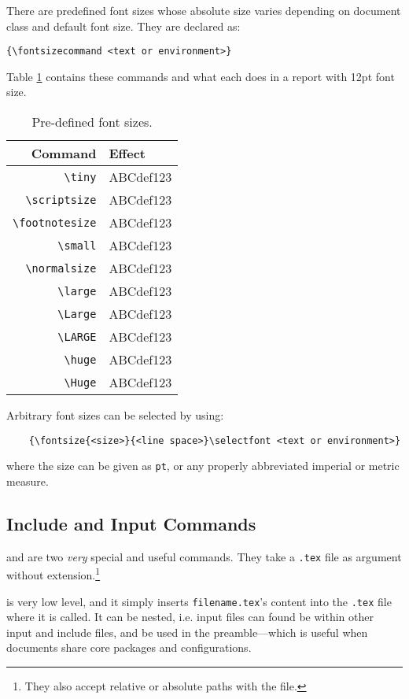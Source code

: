 There are predefined font sizes whose absolute size varies depending
on document class and default font size.  They are declared as:
\begin{verbatim}
{\fontsizecommand <text or environment>}
\end{verbatim}
Table \ref{t:fontsize} contains these commands and what each does in a
report with 12pt font size.
\begin{table}[!htbp]
    \centering
    \caption{Pre-defined font sizes.}
    \label{t:fontsize}
    \begin{tabular}{rl}
        \toprule
        Command & Effect \\
        \midrule
        \verb|\tiny| & {\tiny ABCdef123} \\
        \verb|\scriptsize| & {\scriptsize ABCdef123} \\
        \verb|\footnotesize| & {\footnotesize ABCdef123} \\
        \verb|\small| & {\small ABCdef123} \\
        \verb|\normalsize| & {\normalsize ABCdef123} \\
        \verb|\large| & {\large ABCdef123} \\
        \verb|\Large| & {\Large ABCdef123} \\
        \verb|\LARGE| & {\LARGE ABCdef123} \\
        \verb|\huge| & {\huge ABCdef123} \\
        \verb|\Huge| & {\Huge ABCdef123} \\
        \bottomrule
    \end{tabular}
\end{table}

Arbitrary font sizes can be selected by using:
\begin{verbatim}
	{\fontsize{<size>}{<line space>}\selectfont <text or environment>}
\end{verbatim}
where the size can be given as \verb|pt|, or any properly abbreviated
imperial or metric measure.
%
\subsection{Include and Input Commands}
%
\verb|| and \verb|| are two \emph{very} special and
useful commands.  They take a \texttt{.tex} file as argument without
extension.\footnote{They also accept relative or absolute paths with
  the file.}

\verb|| is very low level, and it simply inserts
\texttt{filename.tex}'s content into the \texttt{.tex} file where it
is called.  It can be nested, i.e. input files can found be within
other input and include files, and be used in the preamble---which is
useful when documents share core packages and configurations.

